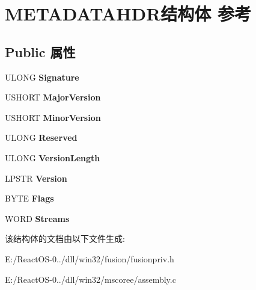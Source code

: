 \hypertarget{struct_m_e_t_a_d_a_t_a_h_d_r}{}\section{M\+E\+T\+A\+D\+A\+T\+A\+H\+D\+R结构体 参考}
\label{struct_m_e_t_a_d_a_t_a_h_d_r}
\subsection*{Public 属性}
\begin{DoxyCompactItemize}
\item 
\mbox{\label{struct_m_e_t_a_d_a_t_a_h_d_r_a79d584dd1bd5ed1f133d22e75d24c6f0}} 
U\+L\+O\+NG {\bfseries Signature}
\item 
\mbox{\label{struct_m_e_t_a_d_a_t_a_h_d_r_ae7075fff5bca64607d5a178534acd93c}} 
U\+S\+H\+O\+RT {\bfseries Major\+Version}
\item 
\mbox{\label{struct_m_e_t_a_d_a_t_a_h_d_r_a1b8f6702192753f145e57292fa0557ea}} 
U\+S\+H\+O\+RT {\bfseries Minor\+Version}
\item 
\mbox{\label{struct_m_e_t_a_d_a_t_a_h_d_r_a78d9ee0e79d0cdc6aee8f24ad7049a50}} 
U\+L\+O\+NG {\bfseries Reserved}
\item 
\mbox{\label{struct_m_e_t_a_d_a_t_a_h_d_r_a474dfdf3671aa41383becca7ff95a470}} 
U\+L\+O\+NG {\bfseries Version\+Length}
\item 
\mbox{\label{struct_m_e_t_a_d_a_t_a_h_d_r_a93729a2b8decdefb95c5afd6b1672355}} 
L\+P\+S\+TR {\bfseries Version}
\item 
\mbox{\label{struct_m_e_t_a_d_a_t_a_h_d_r_a168301d03b0d8656e0a542c3022d0bdd}} 
B\+Y\+TE {\bfseries Flags}
\item 
\mbox{\label{struct_m_e_t_a_d_a_t_a_h_d_r_a89ea03591fa887199fad4075d8387f6e}} 
W\+O\+RD {\bfseries Streams}
\end{DoxyCompactItemize}


该结构体的文档由以下文件生成\+:\begin{DoxyCompactItemize}
\item 
E\+:/\+React\+O\+S-\/0../dll/win32/fusion/fusionpriv.\+h\item 
E\+:/\+React\+O\+S-\/0../dll/win32/mscoree/assembly.\+c\end{DoxyCompactItemize}
